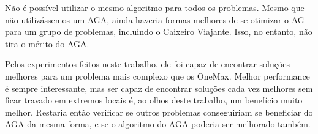 Não é possível utilizar o mesmo algoritmo para todos os problemas. Mesmo que não utilizássemos um AGA, ainda haveria formas melhores de se otimizar o AG para um grupo de problemas, incluindo o Caixeiro Viajante. Isso, no entanto, não tira o mérito do AGA.

Pelos experimentos feitos neste trabalho, ele foi capaz de encontrar soluções melhores para um problema mais complexo que os OneMax. Melhor performance é sempre interessante, mas ser capaz de encontrar soluções cada vez melhores sem ficar travado em extremos locais é, ao olhos deste trabalho, um benefício muito melhor. Restaria então verificar se outros problemas conseguiriam se beneficiar do AGA da mesma forma, e se o algoritmo do AGA poderia ser melhorado também.
